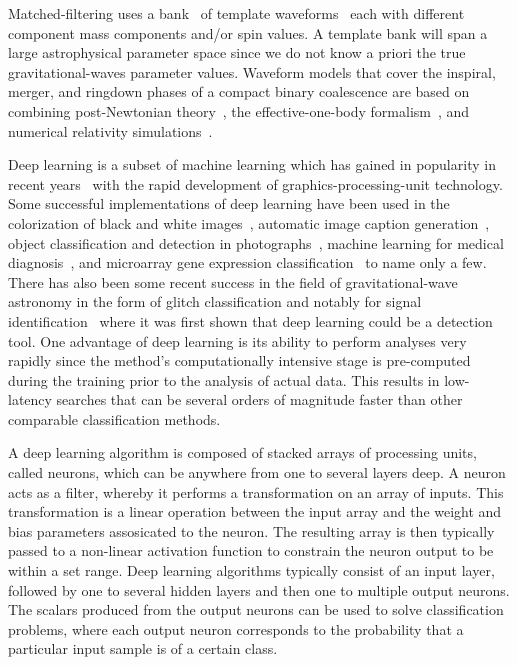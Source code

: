 \documentclass[%
showpacs,
 amsmath,amssymb,
 aps,
 twocolumn,
 prl,
 reprint,
floatfix,
]{revtex4-1}
\begin{document}
%
%
Matched-filtering uses a bank~\cite{PhysRevD.86.084017,
1705.01845,PhysRevD.80.104014, PhysRevD.90.082004, PhysRevD.89.084041} of
template waveforms~\cite{PhysRevD.44.3819, PhysRevD.89.061502,
PhysRevD.89.024003, Blanchet2014} each with different component mass components
and/or spin values. A template bank will span a large astrophysical parameter
space since we do not know a priori the true gravitational-waves parameter
values. Waveform models that cover the inspiral, merger, and ringdown phases of
a compact binary coalescence are based on combining post-Newtonian
theory~\cite{PhysRevD.84.049901,PhysRevD.80.084043,Blanchet2014,PhysRevD.93.084054},
the effective-one-body formalism~\cite{PhysRevD.59.084006}, and numerical
relativity simulations~\cite{PhysRevLett.95.121101}.

%
%
Deep learning is a subset of machine learning which has gained in popularity in
recent years~\cite{NIPS2012_4824, 1406.2661, 1409.1556, 1412.7062, 1311.2901,
1409.4842} with the rapid development of graphics-processing-unit technology.
Some successful implementations of deep learning have been used in the
colorization of black and white images~\cite{1603.08511}, automatic image
caption generation~\cite{1412.2306}, object classification and detection in
photographs~\cite{NIPS2012_4824}, machine learning for medical
diagnosis~\cite{KONONENKO200189}, and microarray gene expression
classification~\cite{Pirooznia2008} to name only a few. There has also been
some recent success in the field of gravitational-wave astronomy in the form of
glitch classification \cite{PhysRevD.95.104059,
0264-9381-34-6-064003,1706.07446} and notably for signal
identification~\cite{1701.00008} where it was first shown that deep learning
could be a detection tool. One advantage of deep learning is its ability to
perform analyses very rapidly since the method's computationally intensive
stage is pre-computed during the training prior to the analysis of actual data.
This results in low-latency searches that can be several orders of magnitude
faster than other comparable classification methods. 

%
%
A deep learning algorithm is composed of stacked arrays of processing units,
called neurons, which can be anywhere from one to several layers deep. A neuron
acts as a filter, whereby it performs a transformation on an array of inputs.
This transformation is a linear operation between the input array and the
weight and bias parameters assosicated to the neuron. The resulting array is
then typically passed to a non-linear activation function to constrain the
neuron output to be within a set range. Deep learning algorithms typically
consist of an input layer, followed by one to several hidden layers and then
one to multiple output neurons. The scalars produced from the output neurons
can be used to solve classification problems, where each output neuron
corresponds to the probability that a particular input sample is of a certain
class.
\end{document}
